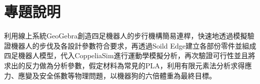 \section{專題說明}
利用線上系統GeoGebra創造四足機器人的步行機構簡易連桿，快速地透過模擬驗證機器人的步伐及各設計參數符合要求，再透過Soild Edge建立各部份零件並組成四足機器人模型，代入CoppeliaSim進行運動學模擬分析，再次驗證可行性並且將求出的反力做為分析參數，假定材料為常見的PLA，利用有限元素法分析求得應力、應變及安全係數等物理問題，以機器狗的六倍體重為最終目標。\\

\renewcommand{\baselinestretch}{0.5} %
